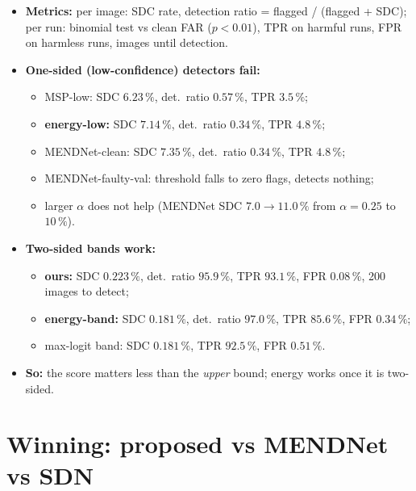 \documentclass[10pt,a4paper]{article}
\begin{document}
\begin{itemize}
  \item \textbf{Metrics:} per image: SDC rate, detection ratio = flagged / (flagged + SDC); per run: binomial
        test vs clean FAR ($p<0.01$), TPR on harmful runs, FPR on harmless runs, images until detection.
  \item \textbf{One-sided (low-confidence) detectors fail:}
  \begin{itemize}
    \item MSP-low: SDC $6.23\,\%$, det.\ ratio $0.57\,\%$, TPR $3.5\,\%$;
    \item \textbf{energy-low:} SDC $7.14\,\%$, det.\ ratio $0.34\,\%$, TPR $4.8\,\%$;
    \item MENDNet-clean: SDC $7.35\,\%$, det.\ ratio $0.34\,\%$, TPR $4.8\,\%$;
    \item MENDNet-faulty-val: threshold falls to zero flags, detects nothing;
    \item larger $\alpha$ does not help (MENDNet SDC $7.0 \to 11.0\,\%$ from $\alpha=0.25$ to $10\,\%$).
  \end{itemize}
  \item \textbf{Two-sided bands work:}
  \begin{itemize}
    \item \textbf{ours:} SDC $\mathbf{0.223\,\%}$, det.\ ratio $95.9\,\%$, TPR $\mathbf{93.1\,\%}$, FPR $0.08\,\%$,
          200 images to detect;
    \item \textbf{energy-band:} SDC $0.181\,\%$, det.\ ratio $97.0\,\%$, TPR $85.6\,\%$, FPR $0.34\,\%$;
    \item max-logit band: SDC $0.181\,\%$, TPR $92.5\,\%$, FPR $0.51\,\%$.
  \end{itemize}
  \item \textbf{So:} the score matters less than the \emph{upper} bound; energy works once it is two-sided.
\end{itemize}

\section{Winning: proposed vs MENDNet vs SDN}
\end{document}

